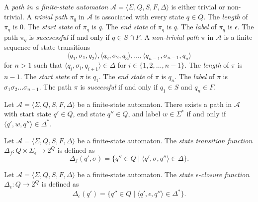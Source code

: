 \begin{definition}
  A \emph{path in a finite-state automaton} $\mathcal{A} = \langle \Sigma, Q, S, F,
  \Delta \rangle$ is either trivial or non-trivial. A \emph{trivial path} $\pi_q$ in
  $\mathcal{A}$ is associated with every state $q \in Q$. The \emph{length} of $\pi_q$ is
  $0$. The \emph{start state} of $\pi_q$ is $q$. The \emph{end state} of $\pi_q$ is $q$. The \emph{label}
  of $\pi_q$ is $\epsilon$. The path $\pi_q$ is \emph{succsessful} if and only if $q \in S
  \cap F$. A \emph{non-trivial path} $\pi$ in $\mathcal{A}$ is a finite sequence of state
  transitions
  \begin{equation*}
    \langle q_1, \sigma_1, q_2 \rangle, \langle q_2, \sigma_2, q_3 \rangle, \ldots,
    \langle q_{n-1}, \sigma_{n-1}, q_n \rangle
  \end{equation*}
  for $n > 1$ such that $\langle q_i, \sigma_i, q_{i+1} \rangle \in \Delta$ for $i
  \in \{ 1, 2, \ldots, n-1 \}$. The \emph{length} of $\pi$ is $n-1$. The \emph{start state} of
  $\pi$ is $q_1$. The \emph{end state} of $\pi$ is $q_n$. The \emph{label} of $\pi$ is $\sigma_1
  \sigma_2 \ldots \sigma_{n-1}$. The path $\pi$ is \emph{successful} if and only if $q_1
  \in S$ and $q_n \in F$.
\end{definition}

\begin{proposition}
  Let $\mathcal{A} = \langle \Sigma, Q, S, F, \Delta \rangle$ be a finite-state
  automaton. There exists a path in $\mathcal{A}$ with start state $q' \in Q$, end
  state $q'' \in Q$, and label $w \in \Sigma^*$ if and only if $\langle q', w, q''
  \rangle \in \Delta^*$.
\end{proposition}

\begin{definition}
  Let $\mathcal{A} = \langle \Sigma, Q, S, F, \Delta \rangle$ be a finite-state
  automaton. The \emph{state transition function} $\Delta_f : Q \times
  \Sigma_\epsilon \rightarrow 2^Q$ is defined as
  \begin{equation*}
    \Delta_f(q', \sigma) = \{ q'' \in Q \mid \langle q', \sigma, q'' \rangle \in
    \Delta \}.
  \end{equation*}
\end{definition}

\begin{definition}
  Let $\mathcal{A} = \langle \Sigma, Q, S, F, \Delta \rangle$ be a finite-state
  automaton. The \emph{state $\epsilon$-closure function} $\Delta_\epsilon : Q
  \rightarrow 2^Q$ is defined as
  \begin{equation*}
    \Delta_\epsilon(q') = \{ q'' \in Q \mid \langle q', \epsilon, q'' \rangle \in
    \Delta^* \}.
  \end{equation*}
\end{definition}

